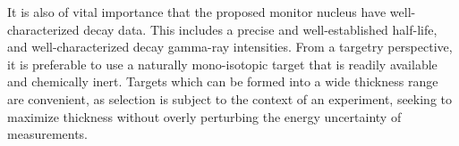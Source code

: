 It is also of vital importance that the proposed monitor nucleus have well-characterized decay data.
This includes a precise and well-established half-life,  
and well-characterized decay gamma-ray intensities.
From a targetry  perspective, it is preferable to use a naturally mono-isotopic target that is readily available
and  chemically inert.
Targets which can be formed into a wide thickness range are convenient, as selection is subject to the context of an experiment, seeking to maximize thickness without overly perturbing the energy uncertainty of  measurements.
